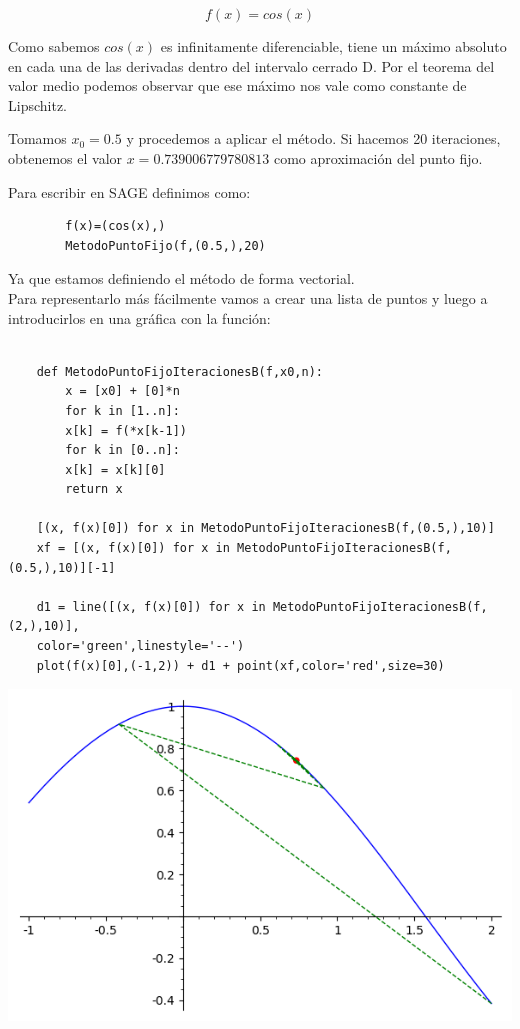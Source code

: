 \begin{example}
	$$f(x) = cos(x)$$
	
	Como sabemos $cos(x)$ es infinitamente diferenciable, tiene un máximo absoluto en cada una de las derivadas dentro del intervalo cerrado D. Por el teorema del valor medio podemos observar que ese máximo nos vale como constante de Lipschitz.
	
	Tomamos $x_0 = 0.5$ y procedemos a aplicar el método.
	Si hacemos 20 iteraciones, obtenemos el valor $x = 0.739006779780813$ como aproximación del punto fijo.
	
	Para escribir en SAGE definimos como:
	\begin{verbatim}
		f(x)=(cos(x),)
		MetodoPuntoFijo(f,(0.5,),20)
	\end{verbatim}
Ya que estamos definiendo el método de forma vectorial.\\

Para representarlo más fácilmente vamos a crear una lista de puntos y luego a introducirlos en una gráfica con la función: 

\begin{verbatim}

	def MetodoPuntoFijoIteracionesB(f,x0,n):
		x = [x0] + [0]*n
		for k in [1..n]:
		x[k] = f(*x[k-1])
		for k in [0..n]:
		x[k] = x[k][0]
		return x

	[(x, f(x)[0]) for x in MetodoPuntoFijoIteracionesB(f,(0.5,),10)]
	xf = [(x, f(x)[0]) for x in MetodoPuntoFijoIteracionesB(f,(0.5,),10)][-1]
	
	d1 = line([(x, f(x)[0]) for x in MetodoPuntoFijoIteracionesB(f,(2,),10)],
	color='green',linestyle='--')
	plot(f(x)[0],(-1,2)) + d1 + point(xf,color='red',size=30)
\end{verbatim} 

\includegraphics[scale=1]{MetodoPuntoFijoCoseno}
\end{example}

